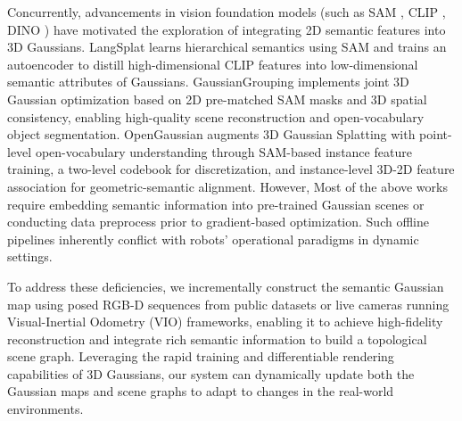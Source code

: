 Concurrently, advancements in vision foundation models (such as SAM \cite{kirillov2023segment}, CLIP \cite{radford2021learningtransferablevisualmodels}, DINO \cite{oquab2024dinov2learningrobustvisual}) have motivated the exploration of integrating 2D semantic features into 3D Gaussians. LangSplat \cite{qin2024langsplat3dlanguagegaussian} learns hierarchical semantics using SAM and trains an autoencoder to distill high-dimensional CLIP features into low-dimensional semantic attributes of Gaussians.  GaussianGrouping \cite{ye2024gaussiangroupingsegmentedit} implements joint 3D Gaussian optimization based on 2D pre-matched SAM masks and 3D spatial consistency,  enabling high-quality scene reconstruction and open-vocabulary object segmentation. OpenGaussian \cite{wu2024opengaussianpointlevel3dgaussianbased} augments 3D Gaussian Splatting with point-level open-vocabulary understanding through SAM-based instance feature training, a two-level codebook for discretization, and instance-level 3D-2D feature association for geometric-semantic alignment. However,  Most of the above works require embedding semantic information into pre-trained Gaussian scenes or conducting data preprocess prior to gradient-based optimization. Such offline pipelines inherently conflict with robots' operational paradigms in dynamic settings.


To address these deficiencies, we incrementally construct the semantic Gaussian map using posed RGB-D sequences from public datasets or live cameras running Visual-Inertial Odometry (VIO) \cite{qin2017vins, qin2018online, qin2019a, qin2019b} frameworks, enabling it to achieve high-fidelity reconstruction and integrate rich semantic information to build a topological scene graph. Leveraging the rapid training and differentiable rendering capabilities of 3D Gaussians, our system can dynamically update both the Gaussian maps and scene graphs to adapt to changes in the real-world environments.